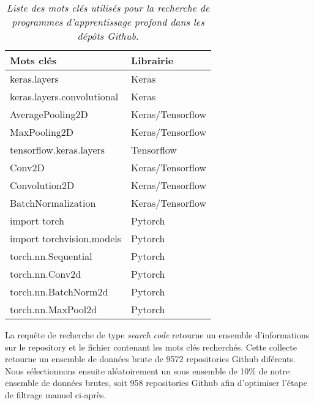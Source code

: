 \begin{table}[h]
  \centering
  \caption{\emph{Liste des mots clés utilisés pour la recherche de programmes d'apprentissage profond dans les dépôts Github.}}
  \label{tab:keywords}
  \begin{tabular}{ll}
    \toprule
    \textbf{Mots clés}         & \textbf{Librairie} \\ \midrule
    keras.layers               & Keras              \\
    keras.layers.convolutional & Keras              \\
    AveragePooling2D           & Keras/Tensorflow   \\
    MaxPooling2D               & Keras/Tensorflow   \\
    tensorflow.keras.layers    & Tensorflow         \\
    Conv2D                     & Keras/Tensorflow   \\
    Convolution2D              & Keras/Tensorflow   \\
    BatchNormalization         & Keras/Tensorflow   \\
    import torch               & Pytorch            \\
    import torchvision.models  & Pytorch            \\
    torch.nn.Sequential        & Pytorch            \\
    torch.nn.Conv2d            & Pytorch            \\
    torch.nn.BatchNorm2d       & Pytorch            \\
    torch.nn.MaxPool2d         & Pytorch            \\ \bottomrule
  \end{tabular}
\end{table}


La requête de recherche de type \emph{search code} retourne un ensemble
d'informations sur le repository et le fichier contenant les mots clés
recherchés. Cette collecte retourne un ensemble de données brute de 9572
repositories Github diférents. Nous sélectionnons ensuite aléatoirement un sous
ensemble de 10\% de notre ensemble de données brutes, soit 958 repositories
Github afin d'optimiser l'étape de filtrage manuel ci-après.

